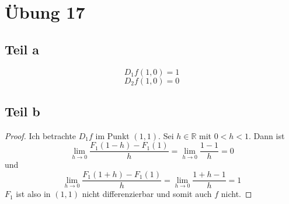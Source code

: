 \documentclass[10pt,a4paper]{article}
\begin{document}
\section*{Übung 17}

\subsection*{Teil a}

\begin{equation}
D_{1} f(1, 0) = 1
\end{equation}
\begin{equation}
D_{2} f(1, 0) = 0
\end{equation}

\subsection*{Teil b}

\begin{proof}
Ich betrachte $D_{1}f$ im Punkt $(1, 1)$.
Sei $h \in \mathbb{R}$ mit $0 < h < 1$.
Dann ist
\begin{equation}
\lim_{h \rightarrow 0} \frac{F_{1}(1 - h) - F_{1}(1)}{h} = \lim_{h \rightarrow 0} \frac{1 - 1}{h} = 0
\end{equation}
und
\begin{equation}
\lim_{h \rightarrow 0} \frac{F_{1}(1 + h) - F_{1}(1)}{h} = \lim_{h \rightarrow 0} \frac{1 + h - 1}{h} = 1
\end{equation}
$F_{1}$ ist also in $(1, 1)$ nicht differenzierbar und somit auch $f$ nicht.
\end{proof}
\end{document}
